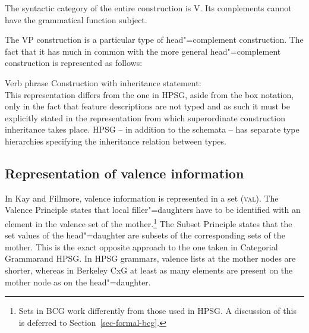 \noindent
The syntactic category of the entire construction is V.
Its complements cannot have the grammatical function subject.

\largerpage%
The VP construction is a particular type of head"=complement construction. The fact that it has much in common with the more general
head"=complement construction is represented as follows:

\ea
Verb phrase Construction with inheritance statement:\\
\setlength{\fboxsep}{2mm}
\z
This representation differs from the one in HPSG, aside from the box notation, only in the fact that feature descriptions are not typed and as such
it must be explicitly stated in the representation from which superordinate construction inheritance takes place.
HPSG -- in addition to the schemata -- has separate type hierarchies specifying the inheritance relation between types.

\subsection{Representation of valence information}

In Kay and Fillmore, valence information is represented in a set (\textsc{val}). The Valence Principle states that local filler"=daughters have to
be identified with an element in the valence set of the mother.\footnote{%
  Sets in BCG work differently from those used in HPSG. A discussion of this is deferred to Section~\ref{sec-formal-bcg}.%
} The Subset Principle states that the set values of the head"=daughter are subsets of the
corresponding sets of the mother. This is the exact opposite approach to the one taken in Categorial Grammar\indexcg and HPSG\indexhpsg. In HPSG
grammars, valence lists at the mother nodes are shorter, whereas in Berkeley CxG at least as many elements are present on the mother
node as on the head"=daughter.

